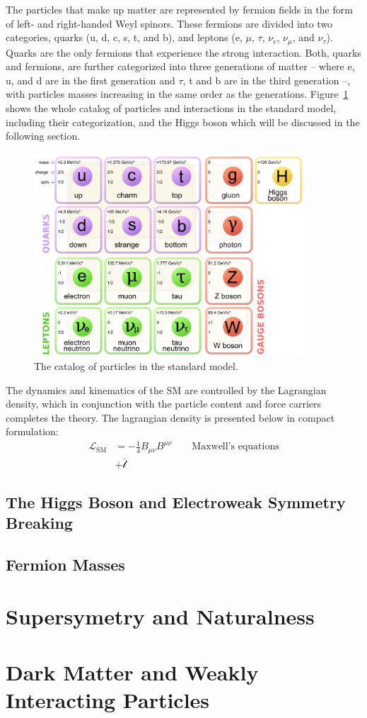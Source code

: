 The particles that make up matter are represented by fermion fields in
the form of left- and right-handed Weyl spinors. These fermions are
divided into two categories, quarks (u, d, c, s, t, and b), and
leptons (e, $\mu$, $\tau$, $\nu_{e}$, $\nu_{\mu}$, and
$\nu_{\tau}$). Quarks are the only fermions that experience the strong
interaction. Both, quarks and fermions, are further categorized into
three generations of matter -- where e, u, and d are in the first
generation and $\tau$, t and b are in the third generation --, with
particles masses increasing in the same order as the
generations. Figure~\ref{fig:SMcartoon} shows the whole catalog of
particles and interactions in the standard model, including their
categorization, and the Higgs boson which will be discussed in the
following section.
\begin{figure}
 \centering
\includegraphics[width=0.9\textwidth]{IntroFigures/TheSM.png}
 \caption{The catalog of particles in the standard model.\label{fig:SMcartoon}}
\end{figure}

The dynamics and kinematics of the SM are controlled by the
Lagrangian density, which in conjunction with the particle content and
force carriers completes the theory. The lagrangian density is
presented below in compact formulation:
\begin{equation}
 \begin{aligned}
        \mathcal{L}_{\mathrm{SM}}& = -\frac{1}{4}B_{\mu\nu}B^{\mu\nu} \qquad \text{Maxwell's equations}\\
        &+\bar{\mathcal{l}}
       \end{aligned}
\label{eq:theSMlagrangian}
\end{equation}
\section{The Higgs Boson and Electroweak Symmetry Breaking}
\section{Fermion Masses}
\chapter{Supersymetry and Naturalness}
\chapter{Dark Matter and Weakly Interacting Particles}


